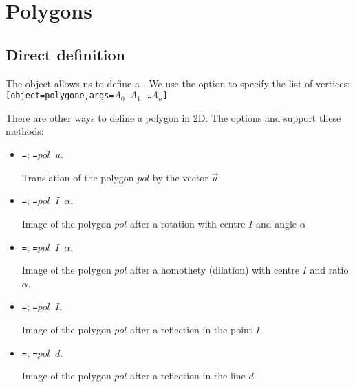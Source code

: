 \section{Polygons}

\subsection{Direct definition}

The object  allows us to define a . We use
the option  to specify the list of vertices:
\texttt{[object=polygone,args=$A_0$ $A_1$ \ldots $A_n$]}

There are other ways to define a polygon in 2D. The options
 and  support these methods:

\begin{itemize}

\item \texttt{=};
\texttt{=$pol$ $u$}.

Translation of the polygon $pol$ by the
vector $\vec u$

\item \texttt{=};
\texttt{=$pol$ $I$ $\alpha $}.

Image of the polygon $pol$
after a rotation with centre $I$ and angle $\alpha $

\item \texttt{=};
\texttt{=$pol$ $I$ $\alpha $}.

Image of the polygon $pol$
after a homothety (dilation) with centre $I$ and ratio $\alpha$.

\item \texttt{=};
\texttt{=$pol$ $I$}.

Image of the polygon $pol$ after a
reflection in the point $I$.

\item \texttt{=};
\texttt{=$pol$ $d$}.

Image of the polygon $pol$ after a
reflection in the line $d$.
\end{itemize}


